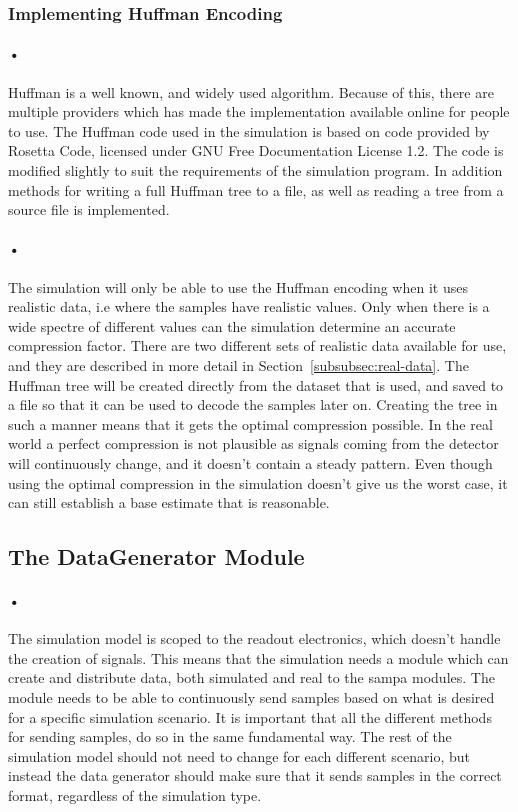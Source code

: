 \documentclass[a4paper, 12pt, openright, twoside]{report}
\begin{document}
\subsubsection{Implementing Huffman Encoding}

\paragraph{•}
Huffman is a well known, and widely used algorithm.
Because of this, there are multiple providers which has made the implementation available online for people to use.
The Huffman code used in the simulation is based on code provided by Rosetta Code, licensed under GNU Free Documentation License 1.2\cite{rosetta}\cite{gnu}.
The code is modified slightly to suit the requirements of the simulation program.
In addition methods for writing a full Huffman tree to a file, as well as reading a tree from a source file is implemented.

\paragraph{•}
The simulation will only be able to use the Huffman encoding when it uses realistic data, i.e where the samples have realistic values.
Only when there is a wide spectre of different values can the simulation determine an accurate compression factor.
There are two different sets of realistic data available for use, and they are described in more detail in Section~\ref{subsubsec:real-data}.
The Huffman tree will be created directly from the dataset that is used, and saved to a file so that it can be used to decode the samples later on.
Creating the tree in such a manner means that it gets the optimal compression possible.
In the real world a perfect compression is not plausible as signals coming from the detector will continuously change, and it doesn't contain a steady pattern.
Even though using the optimal compression in the simulation doesn't give us the worst case, it can still establish a base estimate that is reasonable.

\subsection{The DataGenerator Module}
\paragraph{•}
The simulation model is scoped to the readout electronics, which doesn't handle the creation of signals.
This means that the simulation needs a module which can create and distribute data, both simulated and real to the \gls{sampa} modules.
The module needs to be able to continuously send samples based on what is desired for a specific simulation scenario.
It is important that all the different methods for sending samples, do so in the same fundamental way.
The rest of the simulation model should not need to change for each different scenario, but instead the data generator should make sure that it sends samples in the correct format, regardless of the simulation type.
\end{document}
